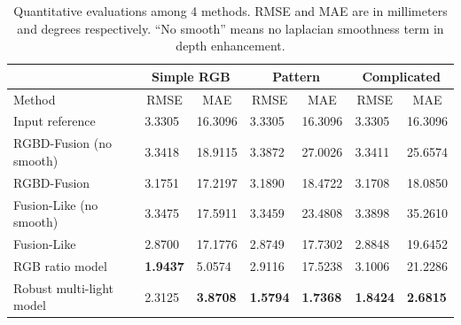 \begin{table}[!ht]
\caption{Quantitative evaluations among 4 methods. RMSE and MAE are in millimeters and degrees respectively. ``No smooth'' means no laplacian smoothness term in depth enhancement.}
\vspace{0.5em}
\label{tab:comp_syn_eval}
\centering
\begin{tabular}{lllllll}
                                       & \multicolumn{2}{c}{Simple RGB}                     & \multicolumn{2}{c}{Pattern}                        & \multicolumn{2}{c}{Complicated}            \\\hline
Method                                 & \multicolumn{1}{c}{RMSE} & \multicolumn{1}{c}{MAE} & \multicolumn{1}{c}{RMSE} & \multicolumn{1}{c}{MAE} & \multicolumn{1}{c}{RMSE} & \multicolumn{1}{c}{MAE} \\\hline\hline
Input reference                              & 3.3305                   & 16.3096                 & 3.3305                   & 16.3096                 & 3.3305                   & 16.3096                 \\
RGBD-Fusion\cite{or2015rgbd} (no smooth)                       & 3.3418                   & 18.9115                 & 3.3872                   & 27.0026                 & 3.3411                   & 25.6574          \\
RGBD-Fusion\cite{or2015rgbd} & 3.1751                   & 17.2197                 & 3.1890                   & 18.4722                 & 3.1708                   & 18.0850                 \\ 
Fusion-Like (no smooth)                  & 3.3475                   & 17.5911                 & 3.3459                   & 23.4808                 & 3.3898                   & 35.2610                 \\
Fusion-Like                        & 2.8700                   & 17.1776                 & 2.8749                   & 17.7302                 & 2.8848                   & 19.6452                 \\
RGB ratio model                        & \textbf{1.9437}          & 5.0574         & 2.9116                   & 17.5238                 & 3.1006                   & 21.2286                 \\
Robust multi-light model               & 2.3125                   & \textbf{3.8708}                  & \textbf{1.5794}          & \textbf{1.7368}         & \textbf{1.8424}          & \textbf{2.6815}  \\\hline      
\end{tabular}
\end{table}



